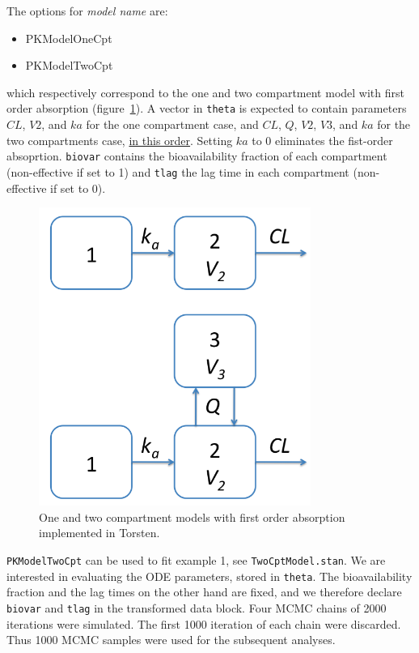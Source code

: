 \documentclass[11pt]{amsart}
\begin{document}
The options for \textit{model name} are:
\begin{itemize}
  \item PKModelOneCpt
  \item PKModelTwoCpt
\end{itemize}
which respectively correspond to the one and two compartment model with first order absorption (figure~\ref{cptModels}). A vector in \texttt{theta} is expected to contain parameters $CL$, $V2$, and $ka$ for the one compartment case, and $CL$, $Q$, $V2$, $V3$, and $ka$ for the two compartments case, \underline{in this order}. Setting $ka$ to 0 eliminates the fist-order absoprtion. \texttt{biovar} contains the bioavailability fraction of each compartment (non-effective if set to 1) and \texttt{tlag} the lag time in each compartment (non-effective if set to 0).

\begin{figure}[htbp]
\includegraphics[width=3.5in,trim=0in 0in 0 0in]{graphics/cptModels.png}
\caption{One and two compartment models with first order absorption implemented in Torsten.}
\label{cptModels}
\end{figure}

\texttt{PKModelTwoCpt} can be used to fit example 1, see \texttt{TwoCptModel.stan}. We are interested in evaluating the ODE parameters, stored in \texttt{theta}. The bioavailability fraction and the lag times on the other hand are fixed, and we therefore declare \texttt{biovar} and \texttt{tlag} in the transformed data block. Four MCMC chains of 2000 iterations were simulated. The first 1000 iteration of each chain were discarded. Thus 1000 MCMC samples were used for the subsequent analyses.
\end{document}
